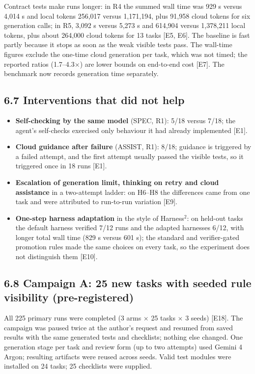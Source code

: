 \documentclass[11pt]{article}
\begin{document}
Contract tests make runs longer: in R4 the summed wall time was 929 s versus 4,014 s and local tokens 256,017 versus 1,171,194, plus 91,958 cloud tokens for six generation calls; in R5, 3,092 s versus 5,273 s and 614,904 versus 1,378,211 local tokens, plus about 264,000 cloud tokens for 13 tasks [E5, E6]. The baseline is fast partly because it stops as soon as the weak visible tests pass. The wall-time figures exclude the one-time cloud generation per task, which was not timed; the reported ratios (1.7–4.3$\times$) are lower bounds on end-to-end cost [E7]. The benchmark now records generation time separately.

\subsection*{6.7 Interventions that did not help}
\begin{itemize}
\item \textbf{Self-checking by the same model} (SPEC, R1): 5/18 versus 7/18; the agent's self-checks exercised only behaviour it had already implemented [E1].
\item \textbf{Cloud guidance after failure} (ASSIST, R1): 8/18; guidance is triggered by a failed attempt, and the first attempt usually passed the visible tests, so it triggered once in 18 runs [E1].
\item \textbf{Escalation of generation limit, thinking on retry and cloud assistance} in a two-attempt ladder: on H6–H8 the differences came from one task and were attributed to run-to-run variation [E9].
\item \textbf{One-step harness adaptation} in the style of Harness$^{2}$: on held-out tasks the default harness verified 7/12 runs and the adapted harnesses 6/12, with longer total wall time (829 s versus 601 s); the standard and verifier-gated promotion rules made the same choices on every task, so the experiment does not distinguish them [E10].
\end{itemize}
\subsection*{6.8 Campaign A: 25 new tasks with seeded rule visibility (pre-registered)}
All 225 primary runs were completed (3 arms $\times$ 25 tasks $\times$ 3 seeds) [E18]. The campaign was paused twice at the author's request and resumed from saved results with the same generated tests and checklists; nothing else changed. One generation stage per task and review form (up to two attempts) used Gemini 4 Argon; resulting artifacts were reused across seeds. Valid test modules were installed on 24 tasks; 25 checklists were supplied.
\end{document}
